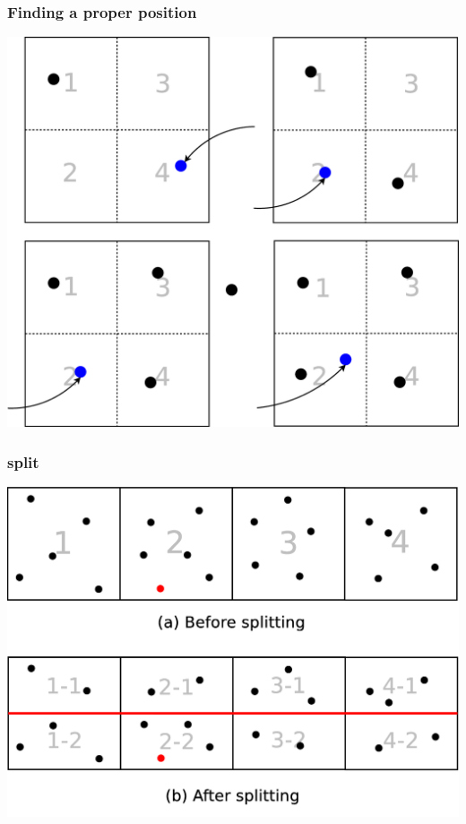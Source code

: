 \documentclass[red]{beamer}
\begin{document}
\begin{frame}
\frametitle{Finding a proper position}
\begin{center}
\includegraphics[scale=0.15]{figs/position.eps}
\end{center}
\end{frame}

\begin{frame}
\frametitle{split}
\begin{center}
\includegraphics[scale=0.15]{figs/split.eps}
\end{center}
\end{frame}
\end{document}
